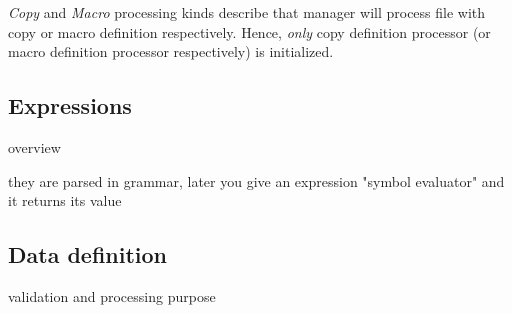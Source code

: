 \emph{Copy} and \emph{Macro} processing kinds describe that manager will process file with copy or macro definition respectively. Hence, \emph{only} copy  definition processor (or macro definition processor respectively) is initialized.



\subsection{Expressions}
overview

they are parsed in grammar, later you give an expression "symbol evaluator" and it returns its value



\subsection{Data definition}

validation and processing purpose